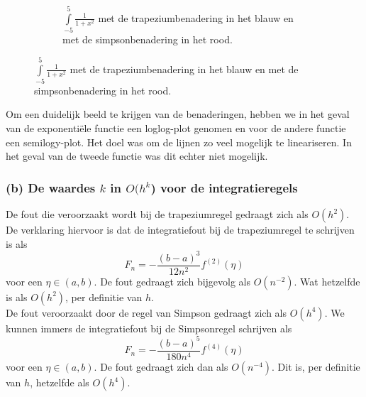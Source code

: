 \documentclass[11pt,a4paper]{article}
\begin{document}
\begin{figure}[H]
\begin{subfigure}{0.5\textwidth}
	\caption*{$\int\limits_{-5}^5\frac{1}{1+x^2}$ met de trapeziumbenadering in het blauw en met de simpsonbenadering in het rood.}
	\end{subfigure}

\end{figure}

Om een duidelijk beeld te krijgen van de benaderingen, hebben we in het geval van de exponenti\"ele functie een loglog-plot genomen en voor de andere functie een semilogy-plot. Het doel was om de lijnen zo veel mogelijk te lineariseren. In het geval van de tweede functie was dit echter niet mogelijk.

\subsubsection*{(b) De waardes $k$ in $O(h^k$) voor de integratieregels}

De fout die veroorzaakt wordt bij de trapeziumregel gedraagt zich als $O(h^2)$. De verklaring hiervoor is dat de integratiefout bij de trapeziumregel te schrijven is als \[ F_n = -\dfrac{(b-a)^3}{12n^2}f^{(2)}(\eta) \] voor een $\eta \in (a,b)$. De fout gedraagt zich bijgevolg als $O(n^{-2})$. Wat hetzelfde is als $O(h^2)$, per definitie van $h$.
\\
De fout veroorzaakt door de regel van Simpson gedraagt zich als $O(h^4)$. We kunnen immers de integratiefout bij de Simpsonregel schrijven als \[ F_n = -\dfrac{(b-a)^5}{180n^4}f^{(4)}(\eta) \] voor een $\eta \in (a,b)$. De fout gedraagt zich dan als $O(n^{-4})$. Dit is, per definitie van $h$, hetzelfde als $O(h^4)$.
\end{document}
